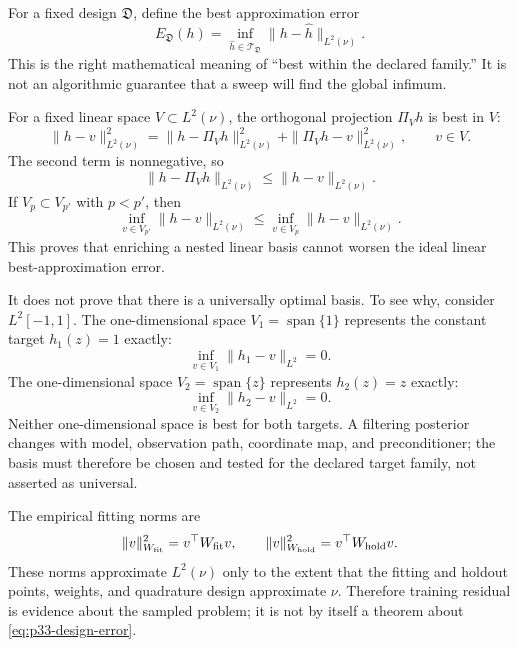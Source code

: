 \documentclass[11pt]{article}
\numberwithin{equation}{section}
\begin{document}
For a fixed design \(\mathfrak D\), define the best approximation error
\begin{equation}
    E_{\mathfrak D}(h)
    =
    \inf_{\widehat h\in\mathcal T_{\mathfrak D}}
    \|h-\widehat h\|_{L^2(\nu)}.
    \label{eq:p33-design-error}
\end{equation}
This is the right mathematical meaning of ``best within the declared family.''
It is not an algorithmic guarantee that a sweep will find the global infimum.

For a fixed linear space \(V\subset L^2(\nu)\), the orthogonal projection
\(\Pi_Vh\) is best in \(V\):
\begin{equation}
    \|h-v\|_{L^2(\nu)}^2
    =
    \|h-\Pi_Vh\|_{L^2(\nu)}^2
    +
    \|\Pi_Vh-v\|_{L^2(\nu)}^2,
    \qquad v\in V.
    \label{eq:p33-projection-pythagoras}
\end{equation}
The second term is nonnegative, so
\begin{equation}
    \|h-\Pi_Vh\|_{L^2(\nu)}
    \le
    \|h-v\|_{L^2(\nu)}.
    \label{eq:p33-projection-best}
\end{equation}
If \(V_p\subset V_{p'}\) with \(p<p'\), then
\begin{equation}
    \inf_{v\in V_{p'}}\|h-v\|_{L^2(\nu)}
    \le
    \inf_{v\in V_p}\|h-v\|_{L^2(\nu)}.
    \label{eq:p33-nested-monotone}
\end{equation}
This proves that enriching a nested linear basis cannot worsen the ideal
linear best-approximation error.

It does not prove that there is a universally optimal basis.  To see why,
consider \(L^2[-1,1]\).  The one-dimensional space \(V_1=\operatorname{span}\{1\}\)
represents the constant target \(h_1(z)=1\) exactly:
\begin{equation}
    \inf_{v\in V_1}\|h_1-v\|_{L^2}=0.
    \label{eq:p33-no-universal-1}
\end{equation}
The one-dimensional space \(V_2=\operatorname{span}\{z\}\) represents
\(h_2(z)=z\) exactly:
\begin{equation}
    \inf_{v\in V_2}\|h_2-v\|_{L^2}=0.
    \label{eq:p33-no-universal-2}
\end{equation}
Neither one-dimensional space is best for both targets.  A filtering posterior
changes with model, observation path, coordinate map, and preconditioner; the
basis must therefore be chosen and tested for the declared target family, not
asserted as universal.

The empirical fitting norms are
\begin{equation}
    \|v\|_{W_{\rm fit}}^2=v^\top W_{\rm fit}v,
    \qquad
    \|v\|_{W_{\rm hold}}^2=v^\top W_{\rm hold}v.
    \label{eq:p33-empirical-norms}
\end{equation}
These norms approximate \(L^2(\nu)\) only to the extent that the fitting and
holdout points, weights, and quadrature design approximate \(\nu\).  Therefore
training residual is evidence about the sampled problem; it is not by itself
a theorem about \eqref{eq:p33-design-error}.
\end{document}
